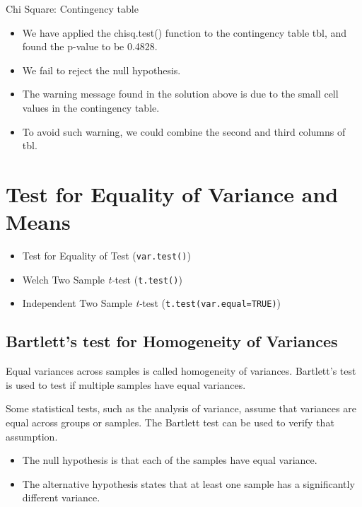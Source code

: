 \documentclass[a4paper,12pt]{article}
\begin{document}
{Chi Square: Contingency table}
\begin{itemize}
	\item We have applied the chisq.test() function to the contingency table tbl, and found the p-value to be 0.4828.
	\item We fail to reject the null hypothesis.
	
	
	\item The warning message found in the solution above is due to the small cell values in the contingency table. \item To avoid such warning, we could combine the second and third columns of tbl.
\end{itemize}




\section{Test for Equality of Variance and Means}

\begin{itemize}
\item Test for Equality of Test (\texttt{var.test()})
\item Welch Two Sample \emph{t-}test (\texttt{t.test()})
\item Independent Two Sample \emph{t-}test (\texttt{t.test(var.equal=TRUE)})

\end{itemize}

\subsection{Bartlett's test for Homogeneity of Variances}
 

Equal variances across samples is called homogeneity of variances. Bartlett's test is used to test if multiple samples have equal variances. 

Some statistical tests, such as the analysis of variance, assume that variances are equal across groups or samples.  The Bartlett test can be used to verify that assumption.

\begin{itemize}
\item The null hypothesis is that each of the samples have equal variance.
\item The alternative hypothesis states that at least one sample has a significantly different variance.
\end{itemize}
\end{document}
